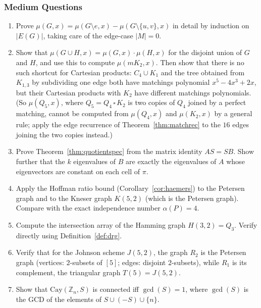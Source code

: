 \subsubsection{Medium Questions}
\begin{enumerate}[resume]
\item Prove $\mu(G, x) = \mu(G \setminus e, x) - \mu(G \setminus \{u, v\}, x)$
in detail by induction on $|E(G)|$, taking care of the edge-case
$|M| = 0$.

\item Show that $\mu(G \cup H, x) = \mu(G, x) \cdot \mu(H, x)$ for the
disjoint union of $G$ and $H$, and use this to compute $\mu(mK_2, x)$.
Then show that there is no such shortcut for Cartesian products:
$C_4 \cup K_1$ and the tree obtained from $K_{1,3}$ by subdividing one
edge both have matchings polynomial $x^5 - 4x^3 + 2x$, but their
Cartesian products with $K_2$ have different matchings polynomials.
(So $\mu(Q_5, x)$, where $Q_5 = Q_4 \,\square\, K_2$ is two copies of
$Q_4$ joined by a perfect matching, cannot be computed from
$\mu(Q_4, x)$ and $\mu(K_2, x)$ by a general rule; apply the edge
recurrence of Theorem~\ref{thm:matchrec} to the $16$ edges joining the
two copies instead.)

\item Prove Theorem~\ref{thm:quotientspec} from the matrix identity
$AS = SB$. Show further that the $k$ eigenvalues of $B$ are exactly
the eigenvalues of $A$ whose eigenvectors are constant on each cell
of $\pi$.

\item Apply the Hoffman ratio bound (Corollary~\ref{cor:haemers}) to the
Petersen graph and to the Kneser graph $K(5, 2)$ (which is the
Petersen graph). Compare with the exact independence number $\alpha(P) = 4$.

\item Compute the intersection array of the Hamming graph $H(3, 2) = Q_3$.
Verify directly using Definition~\ref{def:drg}.

\item Verify that for the Johnson scheme $J(5, 2)$, the graph $R_2$ is the
Petersen graph (vertices: $2$-subsets of $[5]$; edges: disjoint
$2$-subsets), while $R_1$ is its complement, the triangular graph
$T(5) = J(5, 2)$.

\item Show that $\mathrm{Cay}(\mathbb Z_n, S)$ is connected iff $\gcd(S) = 1$,
where $\gcd(S)$ is the GCD of the elements of $S \cup (-S) \cup \{n\}$.


\end{enumerate}
